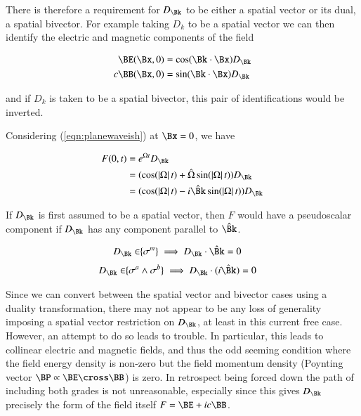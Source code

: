 There is therefore a requirement for $D_\Bk$ to be either a spatial vector or its dual, a spatial bivector.  For example taking $D_k$ to be a spatial vector we can then identify the electric and magnetic components of the field

\begin{align*}
\BE(\Bx,0) &= \cos (\Bk \cdot \Bx) D_\Bk \\
c \BB(\Bx,0) &= \sin (\Bk \cdot \Bx) D_\Bk
\end{align*}

and if $D_k$ is taken to be a spatial bivector, this pair of identifications would be inverted.

Considering (\ref{eqn:planewaveish}) at $\Bx=0$, we have

\begin{align*}
F(0, t)
&= e^{\Omega t} D_\Bk \\
&= (\cos(\Abs{\Omega} t) + \hat{\Omega} \sin(\Abs{\Omega} t)) D_\Bk \\
&= (\cos(\Abs{\Omega} t) - i \hat{\Bk} \sin(\Abs{\Omega} t)) D_\Bk \\
\end{align*}

If $D_\Bk$ is first assumed to be a spatial vector, then $F$ would have a pseudoscalar component if $D_\Bk$ has any component parallel to $\hat{\Bk}$.

\begin{align}\label{eqn:commutationRequirementVector}
D_\Bk \in \span\{\sigma^m\} \implies D_\Bk \cdot \hat{\Bk} = 0
\end{align}
\begin{align}\label{eqn:commutationRequirementBiVector}
D_\Bk \in \span\{\sigma^a \wedge \sigma^b\} \implies D_\Bk \cdot (i\hat{\Bk}) = 0
\end{align}

Since we can convert between the spatial vector and bivector cases using a duality transformation, there may not appear to be any loss of generality imposing a spatial vector restriction on $D_\Bk$, at least in this current free case.  However, an attempt to do so leads to trouble.  In particular, this leads to collinear electric and magnetic fields, and thus the odd seeming condition where the field energy density is non-zero but the field momentum density (Poynting vector $\BP \propto \BE \cross \BB$) is zero.  In retrospect being forced down the path of including both grades is not unreasonable, especially since this gives $D_\Bk$ precisely the form of the field itself $F = \BE + i c \BB$.

